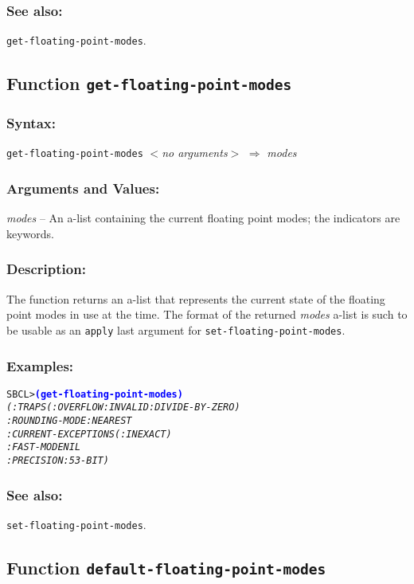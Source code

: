 \documentclass[fleqn]{article}
\newcommand{\code}[1]{\texttt{#1}}
\newcommand{\varname}[1]{\textit{#1}}
\newcommand{\codeprompt}[1]{\textcolor{blue}{\textbf{#1}}}
\newcommand{\DDictionaryItem}[1]{\vspace*{6pt}\noindent\hrulefill\vspace*{-9pt}\subsection*{#1}}
\begin{document}
\subsubsection*{See also:}

\code{get-floating-point-modes}.


\DDictionaryItem{Function \code{get-floating-point-modes}}

\subsubsection*{Syntax:}

\code{get-floating-point-modes} \textit{$<$no arguments$>$}
$\Rightarrow$ \varname{modes}

\subsubsection*{Arguments and Values:}

\varname{modes} -- An a-list containing the current floating
point modes; the indicators are keywords.


\subsubsection*{Description:}

The function returns an a-list that represents the current state of
the floating point modes in use at the time.  The format of the
returned \varname{modes} a-list is such to be
usable as an \code{apply} last argument for
\code{set-floating-point-modes}.


\subsubsection*{Examples:}

\begin{alltt}
SBCL> \codeprompt{(get-floating-point-modes)}
\textit{(:TRAPS (:OVERFLOW :INVALID :DIVIDE-BY-ZERO)
 :ROUNDING-MODE :NEAREST
 :CURRENT-EXCEPTIONS (:INEXACT)
 :FAST-MODE NIL
 :PRECISION :53-BIT)}
\end{alltt}


\subsubsection*{See also:}

\code{set-floating-point-modes}.


\DDictionaryItem{Function \code{default-floating-point-modes}}
\end{document}
